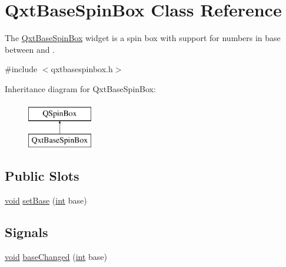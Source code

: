 \hypertarget{class_qxt_base_spin_box}{\section{Qxt\-Base\-Spin\-Box Class Reference}
\label{class_qxt_base_spin_box}
}


The \hyperlink{class_qxt_base_spin_box}{Qxt\-Base\-Spin\-Box} widget is a spin box with support for numbers in base between {} and {}.  




{\ttfamily \#include $<$qxtbasespinbox.\-h$>$}

Inheritance diagram for Qxt\-Base\-Spin\-Box\-:\begin{figure}[H]
\begin{center}
\leavevmode
\includegraphics[height=2.000000cm]{class_qxt_base_spin_box}
\end{center}
\end{figure}
\subsection*{Public Slots}
\begin{DoxyCompactItemize}
\item 
\hyperlink{group___u_a_v_objects_plugin_ga444cf2ff3f0ecbe028adce838d373f5c}{void} \hyperlink{class_qxt_base_spin_box_a1d0a11f5541272aef85d94f3962727c1}{set\-Base} (\hyperlink{ioapi_8h_a787fa3cf048117ba7123753c1e74fcd6}{int} base)
\end{DoxyCompactItemize}
\subsection*{Signals}
\begin{DoxyCompactItemize}
\item 
\hyperlink{group___u_a_v_objects_plugin_ga444cf2ff3f0ecbe028adce838d373f5c}{void} \hyperlink{class_qxt_base_spin_box_af8cc57085db6d17dd82bdcb01bb01057}{base\-Changed} (\hyperlink{ioapi_8h_a787fa3cf048117ba7123753c1e74fcd6}{int} base)
\end{DoxyCompactItemize}
